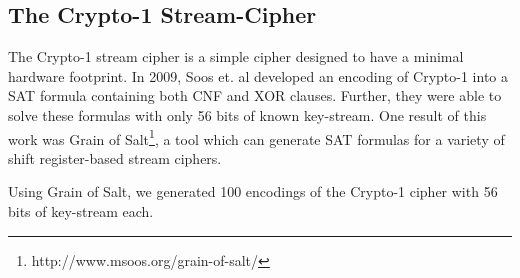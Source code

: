 \subsection{The Crypto-1 Stream-Cipher}
The Crypto-1 stream cipher is a simple cipher designed to have a minimal hardware footprint. In 2009, Soos et. al \cite{SNC09} developed an encoding of Crypto-1 into a SAT formula containing both CNF and XOR clauses. Further, they were able to solve these formulas with only 56 bits of known key-stream. One result of this work was Grain of Salt\footnote{http://www.msoos.org/grain-of-salt/}, a tool which can generate SAT formulas for a variety of shift register-based stream ciphers.

Using Grain of Salt, we generated 100 encodings of the Crypto-1 cipher with 56 bits of key-stream each.
